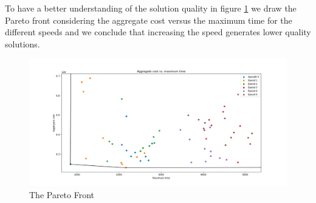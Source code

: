 To have a better understanding of the solution quality in figure \ref{fig:costTime} we draw the Pareto front considering the aggregate cost versus the maximum time for the different speeds and we conclude that increasing the speed generates lower quality solutions.

	\begin{figure}[h!]
		\centering
		\includegraphics[width=\textwidth]{figures/costTime.png}
		\caption[]{The Pareto Front}
		\label{fig:costTime}
	\end{figure}


